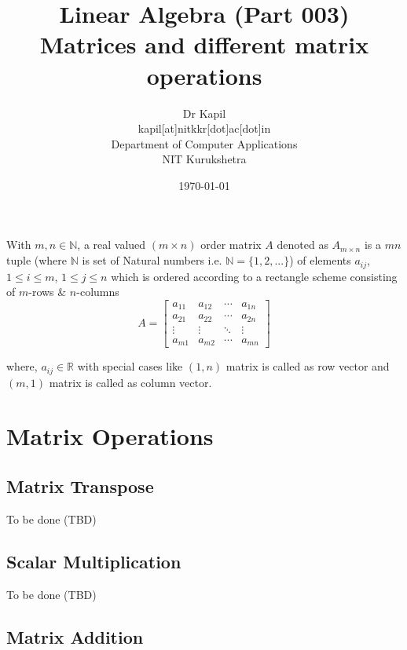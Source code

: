\documentclass{article}
\title{Linear Algebra (Part 003)\\Matrices and different matrix operations}
\author{Dr Kapil\\kapil[at]nitkkr[dot]ac[dot]in\\Department of Computer Applications\\ NIT Kurukshetra}
\date{\today}
\begin{document}
\maketitle

With \(m,n \in \mathbb{N}\), a real valued \((m \times n)\) order matrix \(A\) denoted as \(A_{m \times n}\) is a \(mn\) tuple (where \(\mathbb{N}\) is set of Natural numbers i.e. \(\mathbb{N} = \{ 1, 2, ... \}\)) of elements \( a_{ij}\), \(1 \leq i \leq m\), \(1 \leq j \leq n \) which is ordered according to a rectangle scheme consisting of \(m\)-rows \& \(n\)-columns \\
\[
    A = \begin{bmatrix}
            a_{11} & a_{12} & \cdots & a_{1n} \\
            a_{21} & a_{22} & \cdots & a_{2n} \\
            \vdots  & \vdots  & \ddots & \vdots  \\
            a_{m1} & a_{m2} & \cdots & a_{mn} 
        \end{bmatrix}
\]

where, \( a_{ij} \in \mathbb{R}\) with special cases like \((1, n)\) matrix is called as row vector and \((m, 1)\) matrix is called as column vector.
\section{Matrix Operations}
\subsection{Matrix Transpose}
To be done (TBD)
\subsection{Scalar Multiplication}
To be done (TBD)

\subsection{Matrix Addition}
\end{document}
